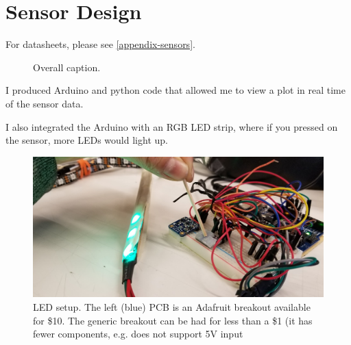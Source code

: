 \documentclass[preprint,12pt,3p]{elsarticle}
\begin{document}
\section{Sensor Design}

For datasheets, please see \ref{appendix-sensors}.

\begin{figure}[htbp]
    \centering 
        \hfil %
        \hfil
        \hfil 
    \caption{ Overall caption.}
\end{figure}

I produced Arduino and python code that allowed me to view a plot in real time of the sensor data.

I also integrated the Arduino with an RGB LED strip, where if you pressed on the sensor,
more LEDs would light up.

\begin{figure}[H]
\centering
\includegraphics[width=.8\textwidth]{images/sensor/poke.jpg}
\caption{LED setup. The left (blue) PCB is an Adafruit breakout available for
\$10. The generic breakout can be had for less than a \$1 (it has fewer
components, e.g. does not support 5V input}
\end{figure}
\end{document}
